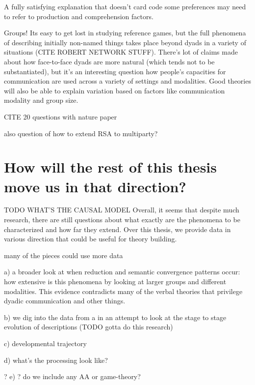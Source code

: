 \documentclass[]{article}
\begin{document}
	A fully satisfying explanation that doesn't card code some preferences may need to refer to production and comprehension factors. 
	
	Groups! Its easy to get lost in studying reference games, but the full phenomena of describing initially non-named things takes place beyond dyads in a variety of situations (CITE ROBERT NETWORK STUFF). There's lot of claims made about how face-to-face dyads are more natural (which tends not to be substantiated), but it's an interesting question how people's capacities for communication are used across a variety of settings and modalities. Good theories will also be able to explain variation based on factors like communication modality and group size. 
	
	CITE 20 questions with nature paper
	
	also question of how to extend RSA to multiparty? 
	
	\section{How will the rest of this thesis move us in that direction?}
	
	TODO WHAT'S THE CAUSAL MODEL
	Overall, it seems that despite much research, there are still questions about what exactly are the phenomena to be characterized and how far they extend. Over this thesis, we provide data in various direction that could be useful for theory building. 
	
	many of the pieces could use more data
	
	a) a broader look at when reduction and semantic convergence patterns occur: how extensive is this phenomena by looking at larger groups and different modalities. This evidence contradicts many of the verbal theories that privilege dyadic communication and other things. 
	
	b) we dig into the data from a in an attempt to look at the stage to stage evolution of descriptions (TODO gotta do this research)
	
	c) developmental trajectory
	
	d) what's the processing look like? 
	
	? e) ? do we include any AA or game-theory? 
\end{document}
